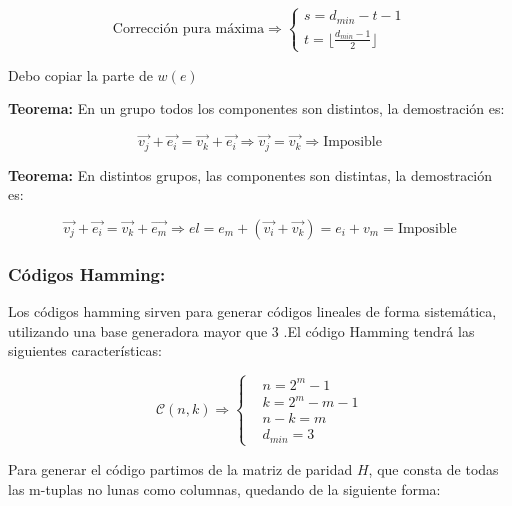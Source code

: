 \documentclass{article}
\begin{document}
\begin{equation}
    \text{Corrección pura máxima}
    \Rightarrow
    \left\{
        \begin{array}{c}
            s = d_{min}-t-1 \\
            t = 
                \big\lfloor
                    \frac{d_{min}-1}{2}
                \big\rfloor
        \end{array}
    \right.
\end{equation}

Debo copiar la parte de $w(e)$

\textbf{Teorema:} En un grupo todos los componentes son distintos, la demostración es:

\begin{equation}
    \vec{v_j} + \vec{e_i} = \vec{v_k} + \vec{e_i} \Rightarrow \vec{v_j} = \vec{v_k} \Rightarrow \text{Imposible}
\end{equation}

\textbf{Teorema:} En distintos grupos, las componentes son distintas, la demostración es:

\begin{equation}
    \vec{v_j} + \vec{e_i} = \vec{v_k} + \vec{e_m} \Rightarrow
    el = e_m + (\vec{v_i} + \vec{v_k}) = 
    e_i + v_m = \text{Imposible}
\end{equation}

\subsubsection{Códigos Hamming:}

Los códigos hamming sirven para generar códigos lineales de forma sistemática, utilizando una base generadora mayor que 3 .El código Hamming tendrá las siguientes características:

\begin{equation}
    \mathcal{C}(n,k) \Rightarrow
    \left\{
        \begin{aligned}{}
            &n=2^m-1\\
            &k = 2^m-m-1\\
            &n-k=m\\
            &d_{min} = 3
        \end{aligned}
    \right.
\end{equation}

Para generar el código partimos de la matriz de paridad $H$, que consta de todas las m-tuplas no lunas como columnas, quedando de la siguiente forma:
\end{document}
